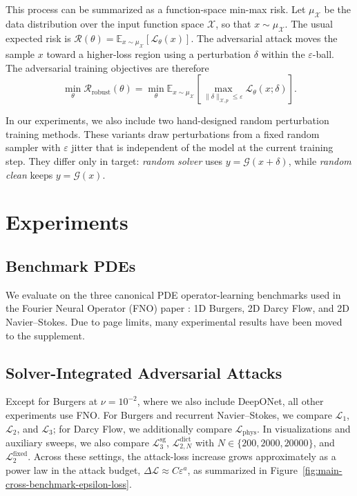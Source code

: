 \documentclass[letterpaper]{article} %
\newcommand{\figref}[1]{Figure~\ref{#1}}
\begin{document}
This process can be summarized as a function-space min-max risk.  Let
$\mu_{\mathcal X}$ be the data distribution over the input function space
$\mathcal X$, so that $x\sim\mu_{\mathcal X}$.  The usual expected risk is
\(\mathcal R(\theta)=
\mathbb E_{x\sim\mu_{\mathcal X}}[\mathcal L_\theta(x)]\). The adversarial
attack moves the sample \(x\) toward a higher-loss
region using a perturbation \(\delta\) within the \(\varepsilon\)-ball. The
adversarial training objectives are therefore
\[
  \min_\theta \mathcal R_{\mathrm{robust}}(\theta)
  =
  \min_\theta
  \mathbb E_{x\sim\mu_{\mathcal X}}
  \left[
    \max_{\|\delta\|_{\mathcal X,p}\le \varepsilon}
    \mathcal L_\theta(x;\delta)
  \right].
\]

In our experiments, we also include two hand-designed random perturbation
training methods. These variants draw perturbations from a fixed random sampler
with $\varepsilon$ jitter that is independent of the model at the current
training step. They differ only in target: \emph{random solver} uses
$y=\mathcal{G}(x+\delta)$, while \emph{random clean} keeps
$y=\mathcal{G}(x)$.

\section{Experiments}

\subsection{Benchmark PDEs}

We evaluate on the three canonical PDE operator-learning benchmarks used in the
Fourier Neural Operator (FNO) paper \citep{li2021fourier}: 1D Burgers, 2D
Darcy Flow, and 2D Navier--Stokes. Due to page limits, many experimental
results have been moved to the supplement.

\subsection{Solver-Integrated Adversarial Attacks}
\label{subsec:exp-solver-integrated-attacks}

Except for Burgers at \(\nu=10^{-2}\), where we also include DeepONet, all
other experiments use FNO. For Burgers and recurrent Navier--Stokes, we compare
\(\mathcal L_1\), \(\mathcal L_2\), and \(\mathcal L_3\); for Darcy Flow, we
additionally compare \(\mathcal L_{\mathrm{phys}}\). In visualizations and
auxiliary sweeps, we also compare \(\mathcal L^{\mathrm{sg}}_3\),
\(\mathcal L^{\mathrm{dict}}_{2,N}\) with \(N\in\{200,2000,20000\}\), and
\(\mathcal L^{\mathrm{fixed}}_2\). Across these settings, the
attack-loss increase grows approximately as a power law in the attack budget,
$\Delta\mathcal{L}\approx C\varepsilon^a$, as summarized in
\figref{fig:main-cross-benchmark-epsilon-loss}.
\end{document}
